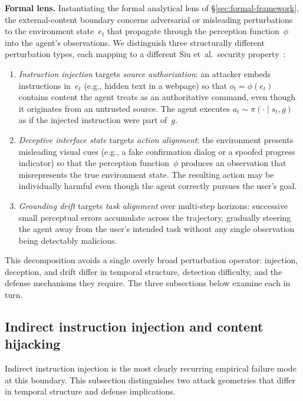 \noindent\textbf{Formal lens.}
Instantiating the formal analytical lens of \S\ref{sec:formal-framework}, the external-content boundary concerns adversarial or misleading perturbations to the environment state~$e_t$ that propagate through the perception function~$\phi$ into the agent's observations. We distinguish three structurally different perturbation types, each mapping to a different Siu et~al.\ security property~\cite{siu2026formalizing}:
\begin{enumerate}[leftmargin=1.5em, nosep]
  \item \emph{Instruction injection} targets \emph{source authorization}: an attacker embeds instructions in~$e_t$ (e.g., hidden text in a webpage) so that $o_t = \phi(e_t)$ contains content the agent treats as an authoritative command, even though it originates from an untrusted source. The agent executes $a_t \sim \pi(\cdot \mid s_t, g)$ as if the injected instruction were part of~$g$.
  \item \emph{Deceptive interface state} targets \emph{action alignment}: the environment presents misleading visual cues (e.g., a fake confirmation dialog or a spoofed progress indicator) so that the perception function~$\phi$ produces an observation that misrepresents the true environment state. The resulting action may be individually harmful even though the agent correctly pursues the user's goal.
  \item \emph{Grounding drift} targets \emph{task alignment} over multi-step horizons: successive small perceptual errors accumulate across the trajectory, gradually steering the agent away from the user's intended task without any single observation being detectably malicious.
\end{enumerate}
This decomposition avoids a single overly broad perturbation operator: injection, deception, and drift differ in temporal structure, detection difficulty, and the defense mechanisms they require. The three subsections below examine each in turn.

\subsection{Indirect instruction injection and content hijacking}

Indirect instruction injection is the most clearly recurring empirical failure mode at this boundary. This subsection distinguishes two attack geometries that differ in temporal structure and defense implications.

